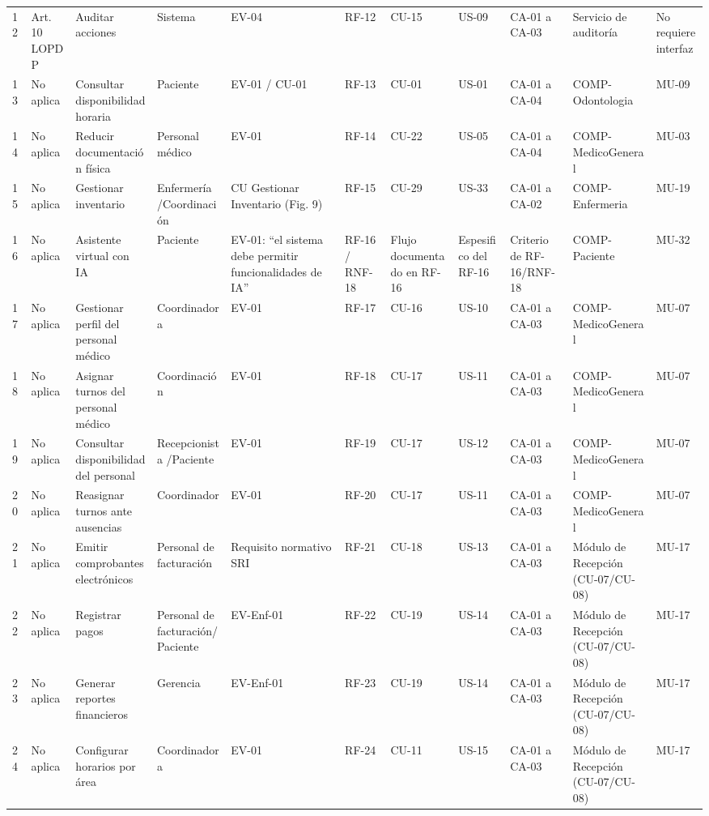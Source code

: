 \documentclass[11pt,a4paper]{article}
\begin{document}
\begin{longtable}{p{} p{} p{} p{} p{} p{} p{} p{} p{} p{} p{}}
		12 & Art. 10 LOPDP & Auditar acciones & Sistema & EV-04 & RF-12 & CU-15 & US-09 & CA-01 a CA-03 & Servicio de auditoría & No requiere interfaz \\
		13 & No aplica & Consultar disponibilidad horaria & Paciente & EV-01 / CU-01 & RF-13 & CU-01 & US-01 & CA-01 a CA-04 & COMP-Odontologia & MU-09 \\
		14 & No aplica & Reducir documentación física & Personal médico & EV-01 & RF-14 & CU-22 & US-05 & CA-01 a CA-04 & COMP-MedicoGeneral & MU-03 \\
		15 & No aplica & Gestionar inventario & Enfermería
		/Coordinación & CU Gestionar Inventario (Fig. 9) & RF-15 & CU-29 & US-33 & CA-01 a CA-02 & COMP-Enfermeria & MU-19 \\	
		16 & No aplica & Asistente virtual con IA & Paciente & EV-01: ``el sistema debe permitir funcionalidades de IA'' & RF-16 / RNF-18 & Flujo documentado en RF-16 & Espesifico 
		del RF-16 & Criterio de RF-16/RNF-18 & COMP-Paciente & MU-32 \\
		17 & No aplica & Gestionar perfil del personal médico & Coordinadora & EV-01 & RF-17 & CU-16 & US-10 & CA-01 a CA-03 & COMP-MedicoGeneral & MU-07 \\
		18 & No aplica & Asignar turnos del personal médico & Coordinación & EV-01 & RF-18 & CU-17 & US-11 & CA-01 a CA-03 & COMP-MedicoGeneral & MU-07 \\
		19 & No aplica & Consultar disponibilidad del personal & Recepcionista
		/Paciente & EV-01 & RF-19 & CU-17 & US-12 & CA-01 a CA-03 & COMP-MedicoGeneral & MU-07 \\
		20 & No aplica & Reasignar turnos ante ausencias & Coordinador & EV-01 & RF-20 & CU-17 & US-11 & CA-01 a CA-03 & COMP-MedicoGeneral & MU-07 \\
		21 & No aplica & Emitir comprobantes electrónicos & Personal de facturación & Requisito normativo SRI & RF-21 & CU-18 & US-13 & CA-01 a CA-03 & Módulo de Recepción (CU-07/CU-08) & MU-17 \\
		22 & No aplica & Registrar pagos & Personal de facturación/Paciente & EV-Enf-01 & RF-22 & CU-19 & US-14 & CA-01 a CA-03 & Módulo de Recepción (CU-07/CU-08) & MU-17 \\
		23 & No aplica & Generar reportes financieros & Gerencia & EV-Enf-01 & RF-23 & CU-19 & US-14 & CA-01 a CA-03 & Módulo de Recepción (CU-07/CU-08) & MU-17 \\
		24 & No aplica & Configurar horarios por área & Coordinadora & EV-01 & RF-24 & CU-11 & US-15 & CA-01 a CA-03 & Módulo de Recepción (CU-07/CU-08) & MU-17 \\

\end{longtable}
\end{document}
